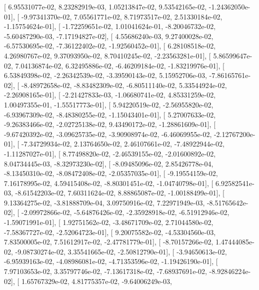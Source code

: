 \documentclass{article}
\begin{document}
       [  6.95531077e-02,   8.23282919e-03,   1.05213847e-02,
          9.53542165e-02,  -1.24362050e-01],
       [ -9.97341370e-02,   7.05561771e-02,   8.71973517e-02,
          2.51330184e-02,  -1.15754624e-01],
       [ -1.72259651e-02,   1.01041624e-01,  -8.20046732e-02,
         -5.60487290e-03,  -7.17194827e-02],
       [  4.55686240e-03,   9.27400028e-02,  -6.57530695e-02,
         -7.36122402e-02,  -1.92560452e-01],
       [  6.28108518e-02,   4.26980767e-02,   9.37093950e-02,
          8.70410245e-02,  -2.23563281e-01],
       [  5.86599647e-02,   7.04136874e-02,   6.32495886e-02,
         -6.46209184e-02,  -1.83219976e-01],
       [  6.53849398e-02,  -2.26342539e-02,  -3.39590143e-02,
          5.15952706e-03,  -7.86165761e-02],
       [ -8.48972658e-02,  -8.83482309e-02,  -6.80511140e-02,
          5.33544924e-02,  -2.26908165e-01],
       [ -2.21427833e-03,  -1.06680741e-02,   4.85331259e-02,
          1.00497355e-01,  -1.55517773e-01],
       [  5.94220519e-02,  -2.56955820e-02,  -6.93967309e-02,
         -8.48380255e-02,  -1.15043401e-01],
       [  5.27007633e-02,  -9.26383466e-02,  -2.02725138e-02,
          9.43490172e-02,  -1.28861609e-01],
       [ -9.67420392e-02,  -3.09625735e-02,  -3.90908974e-02,
         -6.46069955e-02,  -2.12767200e-01],
       [ -7.34729934e-02,   2.13764650e-02,   2.46107661e-02,
         -7.48922944e-02,  -1.11287027e-01],
       [  8.77498820e-02,  -2.46539155e-02,  -2.01600892e-02,
          8.04734445e-03,  -8.32973230e-02],
       [ -8.09485096e-02,   2.85426778e-04,  -8.13450310e-02,
         -8.08472408e-02,  -2.05357035e-01],
       [ -9.19554159e-02,   7.16178995e-02,   4.59415408e-02,
         -8.80301451e-02,  -1.04740798e-01],
       [  6.92582541e-03,  -8.61542203e-02,   7.60311624e-02,
          8.88865087e-02,  -1.00188499e-01],
       [  9.13364275e-02,  -3.81888709e-04,   3.09750916e-02,
          7.22971949e-03,  -8.51765642e-02],
       [ -2.09972866e-02,  -5.64876426e-02,  -2.35928918e-02,
         -6.51912946e-02,  -1.59071991e-01],
       [  1.92751562e-02,  -3.48671709e-02,   2.71044580e-02,
         -7.58367727e-02,  -2.52064723e-01],
       [  9.20075582e-02,  -4.53304560e-03,   7.83500005e-02,
          7.51612917e-02,  -2.47781779e-01],
       [ -8.70157266e-02,   1.47444085e-02,  -9.08730274e-02,
          3.35541665e-02,  -2.50812790e-01],
       [ -3.94650613e-02,  -6.95939163e-02,  -4.08986081e-02,
         -4.71353596e-02,  -1.19426190e-01],
       [  7.97103653e-02,   3.35797746e-02,  -7.13617318e-02,
         -7.68937691e-02,  -8.92846224e-02],
       [  1.65767329e-02,   4.81775357e-02,  -9.64006249e-03,
\end{document}
